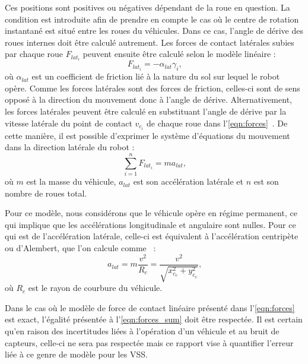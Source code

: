 Ces positions sont positives ou négatives dépendant de la roue en question.
La condition est introduite afin de prendre en compte le cas où le centre de rotation instantané est situé entre les roues du véhicules.
Dans ce cas, l'angle de dérive des roues internes doit être calculé autrement.
Les forces de contact latérales subies par chaque roue $F_{lat_i}$ peuvent ensuite être calculé selon le modèle linéaire :
\begin{equation}
	F_{lat_i} = -\alpha_{lat} \gamma_i \text{,}
	\label{eqn:forces}
\end{equation}
où $\alpha_{lat}$ est un coefficient de friction lié à la nature du sol sur lequel le robot opère.
Comme les forces latérales sont des forces de friction, celles-ci sont de sens opposé à la direction du mouvement donc à l'angle de dérive. 
Alternativement, les forces latérales peuvent être calculé en substituant l'angle de dérive par la vitesse latérale du point de contact $v_{c_i}$ de chaque roue dans l'\autoref{eqn:forces}~\citep{Seegmiller2016}.
De cette manière, il est possible d'exprimer le système d'équations du mouvement dans la direction latérale du robot :
\begin{equation}
	\sum_{i=1}^{n} F_{lat_i} = m a_{lat} \text{,}
	\label{eqn:forces_sum}
\end{equation}
où $m$ est la masse du véhicule, $a_{lat}$ est son accélération latérale et $n$ est son nombre de roues total.

Pour ce modèle, nous considérons que le véhicule opère en régime permanent, ce qui implique que les accélérations longitudinale et angulaire sont nulles.
Pour ce qui est de l'accélération latérale, celle-ci est équivalent à l'accélération centripète ou d'Alembert, que l'on calcule comme~\citep{Maclaurin2011} :
\begin{equation}
	a_{lat} = m \frac{v^2}{R_c} = \frac{v^2}{\sqrt{x_{c_v}^2 + y_{c_v}^2}} \text{,}
	\label{eqn:centripete}
\end{equation}
où $R_c$ est le rayon de courbure du véhicule. 

Dans le cas où le modèle de force de contact linéaire présenté dans l'\autoref{eqn:forces} est exact, l'égalité présentée à l'\autoref{eqn:forces_sum} doit être respectée.
Il est certain qu'en raison des incertitudes liées à l'opération d'un véhicule et au bruit de capteurs, celle-ci ne sera pas respectée mais ce rapport vise à quantifier l'erreur liée à ce genre de modèle pour les \ac{VSS}.

